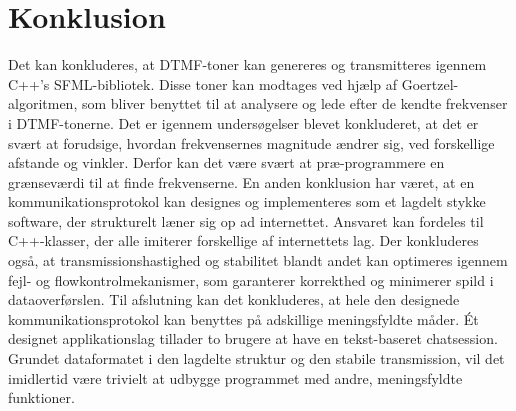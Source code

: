 \section{Konklusion}
Det kan konkluderes, at DTMF-toner kan genereres og transmitteres igennem C++'s SFML-bibliotek. Disse toner kan modtages ved hjælp af Goertzel-algoritmen, som bliver benyttet til at analysere og lede efter de kendte frekvenser i DTMF-tonerne. Det er igennem undersøgelser blevet konkluderet, at det er svært at forudsige, hvordan frekvensernes magnitude ændrer sig, ved forskellige afstande og vinkler. Derfor kan det være svært at præ-programmere en grænseværdi til at finde frekvenserne. En anden konklusion har været, at en kommunikationsprotokol kan designes og implementeres som et lagdelt stykke software, der strukturelt læner sig op ad internettet. Ansvaret kan fordeles til C++-klasser, der alle imiterer forskellige af internettets lag. Der konkluderes også, at transmissionshastighed og stabilitet blandt andet kan optimeres igennem fejl- og flowkontrolmekanismer, som garanterer korrekthed og minimerer spild i dataoverførslen. Til afslutning kan det konkluderes, at hele den designede kommunikationsprotokol kan benyttes på adskillige meningsfyldte måder. Ét designet applikationslag tillader to brugere at have en tekst-baseret chatsession. Grundet dataformatet i den lagdelte struktur og den stabile transmission, vil det imidlertid være trivielt at udbygge programmet med andre, meningsfyldte funktioner.